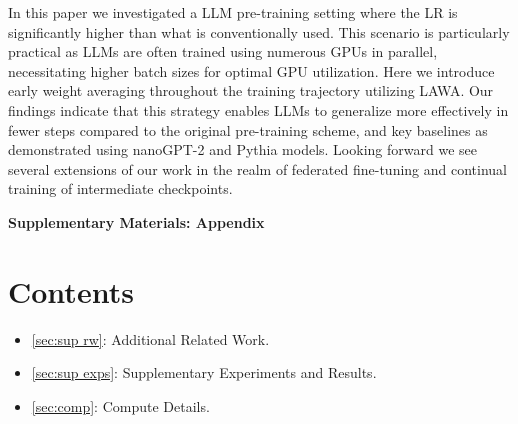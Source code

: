 \documentclass{article}
\newcommand{\method}{LAWA}
\begin{document}
In this paper we investigated a LLM pre-training setting where the LR is significantly higher than what is conventionally used. This scenario is particularly practical as LLMs are often trained using numerous GPUs in parallel, necessitating higher batch sizes for optimal GPU utilization. Here we introduce early weight averaging throughout the training trajectory utilizing \method{}. Our findings indicate that this strategy enables LLMs to generalize more effectively in fewer steps compared to the original pre-training scheme, and key baselines as demonstrated using nanoGPT-2 and Pythia models. Looking forward we see several extensions of our work in the realm of federated fine-tuning and continual training of intermediate checkpoints.


\newpage



\newpage
\appendix
\begin{center}
    \textbf{\Large \centering Supplementary Materials: Appendix}\vspace{3mm} \label{sec:appdx}
\end{center}

\section*{Contents}
\begin{itemize}
    \item \ref{sec:sup rw}: Additional Related Work.
    \item \ref{sec:sup exps}: Supplementary Experiments and Results.
    \item \ref{sec:comp}: Compute Details.
    
\end{itemize}
\end{document}
